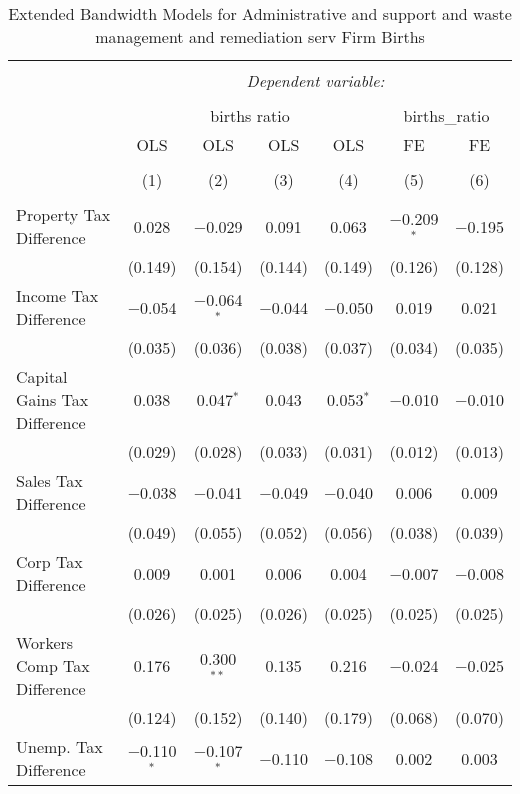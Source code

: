 
\begin{table}[!htbp] \centering 
  \caption{Extended Bandwidth Models for  Administrative and support and waste management and remediation serv Firm Births} 
  \label{56eb} 
\begin{tabular}{@{\extracolsep{5pt}}lcccccc} 
\\[-1.8ex]\hline 
\hline \\[-1.8ex] 
 & \multicolumn{6}{c}{\textit{Dependent variable:}} \\ 
\cline{2-7} 
\\[-1.8ex] & \multicolumn{4}{c}{births ratio} & \multicolumn{2}{c}{births\_ratio} \\ 
 & OLS & OLS & OLS & OLS & FE & FE \\ 
\\[-1.8ex] & (1) & (2) & (3) & (4) & (5) & (6)\\ 
\hline \\[-1.8ex] 
 Property Tax Difference & 0.028 & $-$0.029 & 0.091 & 0.063 & $-$0.209$^{*}$ & $-$0.195 \\ 
  & (0.149) & (0.154) & (0.144) & (0.149) & (0.126) & (0.128) \\ 
  Income Tax Difference & $-$0.054 & $-$0.064$^{*}$ & $-$0.044 & $-$0.050 & 0.019 & 0.021 \\ 
  & (0.035) & (0.036) & (0.038) & (0.037) & (0.034) & (0.035) \\ 
  Capital Gains Tax Difference & 0.038 & 0.047$^{*}$ & 0.043 & 0.053$^{*}$ & $-$0.010 & $-$0.010 \\ 
  & (0.029) & (0.028) & (0.033) & (0.031) & (0.012) & (0.013) \\ 
  Sales Tax Difference & $-$0.038 & $-$0.041 & $-$0.049 & $-$0.040 & 0.006 & 0.009 \\ 
  & (0.049) & (0.055) & (0.052) & (0.056) & (0.038) & (0.039) \\ 
  Corp Tax Difference & 0.009 & 0.001 & 0.006 & 0.004 & $-$0.007 & $-$0.008 \\ 
  & (0.026) & (0.025) & (0.026) & (0.025) & (0.025) & (0.025) \\ 
  Workers Comp Tax Difference & 0.176 & 0.300$^{**}$ & 0.135 & 0.216 & $-$0.024 & $-$0.025 \\ 
  & (0.124) & (0.152) & (0.140) & (0.179) & (0.068) & (0.070) \\ 
  Unemp. Tax Difference & $-$0.110$^{*}$ & $-$0.107$^{*}$ & $-$0.110 & $-$0.108 & 0.002 & 0.003 \\ 

\end{tabular}
\end{table}
